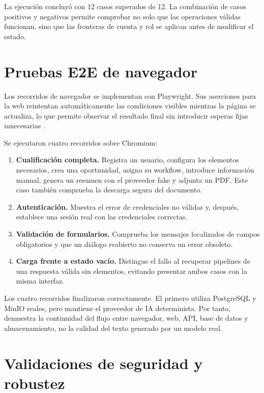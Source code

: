 La ejecución concluyó con 12 casos superados de 12. La combinación de casos
positivos y negativos permite comprobar no solo que las operaciones válidas
funcionan, sino que las fronteras de cuenta y rol se aplican antes de modificar
el estado.

\section{Pruebas E2E de navegador}
\label{sec:browser-e2e-tests}

Los recorridos de navegador se implementan con Playwright. Sus aserciones para
la web reintentan automáticamente las condiciones visibles mientras la página
se actualiza, lo que permite observar el resultado final sin introducir esperas
fijas innecesarias \cite{playwrightAssertions2026}.

Se ejecutaron cuatro recorridos sobre Chromium:

\begin{enumerate}
  \item \textbf{Cualificación completa.} Registra un usuario, configura los
  elementos necesarios, crea una oportunidad, asigna su workflow, introduce
  información manual, genera un resumen con el proveedor fake y adjunta un PDF.
  Este caso también comprueba la descarga segura del documento.
  \item \textbf{Autenticación.} Muestra el error de credenciales no válidas y,
  después, establece una sesión real con las credenciales correctas.
  \item \textbf{Validación de formularios.} Comprueba los mensajes localizados
  de campos obligatorios y que un diálogo reabierto no conserva un error
  obsoleto.
  \item \textbf{Carga frente a estado vacío.} Distingue el fallo al recuperar
  pipelines de una respuesta válida sin elementos, evitando presentar ambos
  casos con la misma interfaz.
\end{enumerate}

Los cuatro recorridos finalizaron correctamente. El primero utiliza
PostgreSQL y MinIO reales, pero mantiene el proveedor de IA determinista. Por
tanto, demuestra la continuidad del flujo entre navegador, web, API, base de
datos y almacenamiento, no la calidad del texto generado por un modelo real.

\section{Validaciones de seguridad y robustez}
\label{sec:security-robustness-tests}

